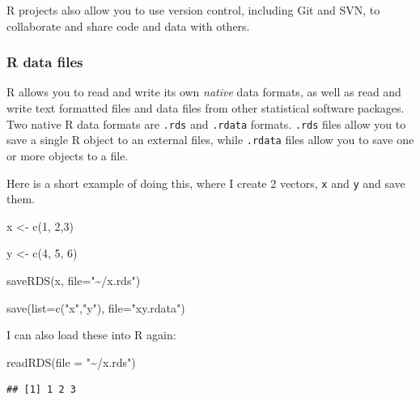 \documentclass[
]{article}
\newenvironment{Shaded}{\begin{snugshade}}{\end{snugshade}}
\newcommand{\AttributeTok}[1]{\textcolor[rgb]{0.77,0.63,0.00}{#1}}
\newcommand{\DecValTok}[1]{\textcolor[rgb]{0.00,0.00,0.81}{#1}}
\newcommand{\FunctionTok}[1]{\textcolor[rgb]{0.00,0.00,0.00}{#1}}
\newcommand{\NormalTok}[1]{#1}
\newcommand{\OtherTok}[1]{\textcolor[rgb]{0.56,0.35,0.01}{#1}}
\newcommand{\StringTok}[1]{\textcolor[rgb]{0.31,0.60,0.02}{#1}}
\begin{document}
R projects also allow you to use version control, including Git and SVN,
to collaborate and share code and data with others.

\hypertarget{r-data-files}{%
\subsubsection{R data files}\label{r-data-files}}

R allows you to read and write its own \emph{native} data formats, as well as
read and write text formatted files and data files from other
statistical software packages. Two native R data formats are \texttt{.rds} and
\texttt{.rdata} formats. \texttt{.rds} files allow you to save a single R object to an
external files, while \texttt{.rdata} files allow you to save one or more
objects to a file.

Here is a short example of doing this, where I create 2 vectors, \texttt{x} and
\texttt{y} and save them.

\begin{Shaded}
\begin{Highlighting}[]
\NormalTok{x }\OtherTok{\textless{}{-}} \FunctionTok{c}\NormalTok{(}\DecValTok{1}\NormalTok{, }\DecValTok{2}\NormalTok{,}\DecValTok{3}\NormalTok{)}

\NormalTok{y }\OtherTok{\textless{}{-}} \FunctionTok{c}\NormalTok{(}\DecValTok{4}\NormalTok{, }\DecValTok{5}\NormalTok{, }\DecValTok{6}\NormalTok{)}

\FunctionTok{saveRDS}\NormalTok{(x, }
        \AttributeTok{file=}\StringTok{"\textasciitilde{}/x.rds"}\NormalTok{)}

\FunctionTok{save}\NormalTok{(}\AttributeTok{list=}\FunctionTok{c}\NormalTok{(}\StringTok{"x"}\NormalTok{,}\StringTok{"y"}\NormalTok{),}
     \AttributeTok{file=}\StringTok{"xy.rdata"}\NormalTok{)}
\end{Highlighting}
\end{Shaded}

I can also load these into R again:

\begin{Shaded}
\begin{Highlighting}[]
\FunctionTok{readRDS}\NormalTok{(}\AttributeTok{file =} \StringTok{"\textasciitilde{}/x.rds"}\NormalTok{)}
\end{Highlighting}
\end{Shaded}

\begin{verbatim}
## [1] 1 2 3
\end{verbatim}
\end{document}

